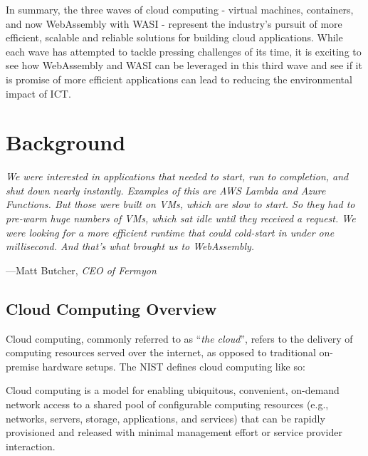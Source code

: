 \documentclass[
  table]{report}
\begin{document}
In summary, the three waves of cloud computing - virtual machines,
containers, and now WebAssembly with \ac{WASI} - represent the
industry's pursuit of more efficient, scalable and reliable solutions
for building cloud applications. While each wave has attempted to tackle
pressing challenges of its time, it is exciting to see how WebAssembly
and \ac{WASI} can be leveraged in this third wave and see if it is
promise of more efficient applications can lead to reducing the
environmental impact of ICT.

\newpage

\chapter{Background}
\label{chap:background}

\setlength{}

\epigraph{\itshape  
We were interested in
applications that needed to start, run to completion, and shut down nearly
instantly. Examples of this are AWS Lambda and Azure Functions. But those were
built on VMs, which are slow to start. So they had to pre-warm huge numbers of
VMs, which sat idle until they received a request. We were looking for a more
efficient runtime that could cold-start in under one millisecond. And that’s
what brought us to WebAssembly.
}{---Matt Butcher, \textit{CEO of Fermyon}}

\section{Cloud Computing Overview}
\label{sect:cloud-overview}

Cloud computing, commonly referred to as ``\emph{the cloud}'', refers to
the delivery of computing resources served over the internet, as opposed
to traditional on-premise hardware setups. The \ac{NIST} defines cloud
computing like so:

\begin{tcolorbox}[
  definitionstyle,
  title=NIST definition of Cloud Computing,
]
Cloud computing is a model for enabling ubiquitous, convenient, on-demand
network access to a shared pool of configurable computing resources (e.g.,
networks, servers, storage, applications, and services) that can be rapidly
provisioned and released with minimal management effort or service provider
interaction. \\

\hfill \citep{nist-def}

\end{tcolorbox}
\end{document}
